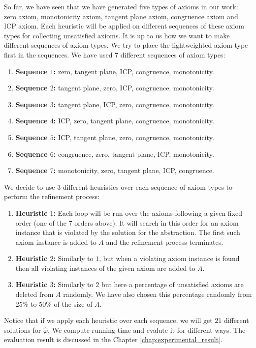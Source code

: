 \noindent So far, we have seen that we have generated five types of axioms in our work: zero axiom, monotonicity axiom, tangent plane axiom, congruence axiom and ICP axiom.
Each heuristic will be applied on different sequences of these axiom types for collecting unsatisfied axioms.
It is up to us how we want to make different sequences of axiom types.
We try to place the lightweighted axiom type first in the sequences.
We have used $7$ different sequences of axiom types:

\begin{enumerate}
    \item \textbf{Sequence $1$:} zero, tangent plane, ICP, congruence, monotonicity. \label{item:sequences}
    \item \textbf{Sequence $2$:} tangent plane, zero, ICP, congruence, monotonicity.
    \item \textbf{Sequence $3$:} tangent plane, ICP, zero, congruence, monotonicity.
    \item \textbf{Sequence $4$:} ICP, zero, tangent plane, congruence, monotonicity.
    \item \textbf{Sequence $5$:} ICP, tangent plane, zero, congruence, monotonicity.
    \item \textbf{Sequence $6$:} congruence, zero, tangent plane, ICP, monotonicity.
    \item \textbf{Sequence $7$:} monotonicity, zero, tangent plane, ICP, congruence.
\end{enumerate}

\noindent We decide to use $3$ different heuristics over each sequence of axiom types to perform the refinement process:

\begin{enumerate}
\label{item:heuristics}
    \item \textbf{Heuristic $1$:} Each loop will be run over the axioms following a given fixed order (one of the $7$ orders above).
    It will search in this order for an axiom instance that is violated by the solution for the abstraction.
    The first such axiom instance is added to $A$ and the refinement process terminates.
    \item \textbf{Heuristic $2$:} Similarly to $1$, but when a violating axiom instance is found then all violating instances of the given axiom are added to $A$.
    \item \textbf{Heuristic $3$:} Similarly to $2$ but here a percentage of unsatisfied axioms are deleted from $A$ randomly.
    We have also chosen this percentage randomly from $25\%$ to $50\%$ of the size of $A$.
\end{enumerate}

\noindent Notice that if we apply each heuristic over each sequence, we will get $21$ different solutions for $\hat{\varphi}$.
We compute running time and evalute it for different ways.
The evaluation result is discussed in the Chapter \ref{chap:experimental_result}.




